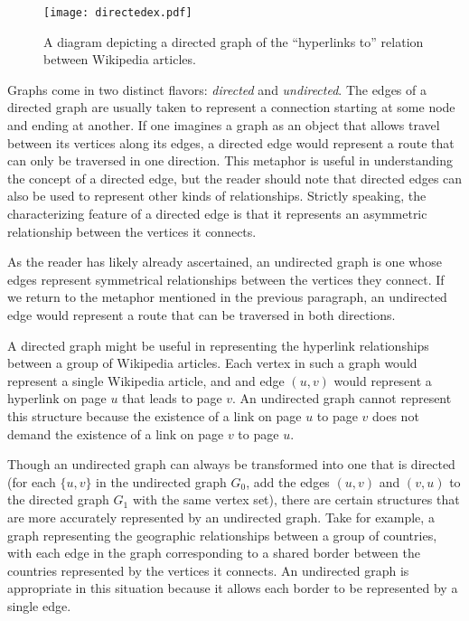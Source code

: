 \documentclass[12pt,twoside]{reedthesis}
\newcommand{\im}[1]{{\em#1}}
\begin{document}
\begin{figure}[h!]
\begin{center}
\texttt{[image: directedex.pdf]}
\end{center}
\caption{A diagram depicting a directed graph of the ``hyperlinks to'' relation between Wikipedia articles.}
\end{figure}
Graphs come in two distinct flavors: \im{directed} and \im{undirected}. The edges of a directed graph are usually taken to represent a connection starting at some node and ending at another. If one imagines a graph as an object that allows travel between its vertices along its edges, a directed edge would represent a route that can only be traversed in one direction. This metaphor is useful in understanding the concept of a directed edge, but the reader should note that directed edges can also be used to represent other kinds of relationships. Strictly speaking, the characterizing feature of a directed edge is that it represents an asymmetric relationship between the vertices it connects.

As the reader has likely already ascertained, an undirected graph is one whose edges represent symmetrical relationships between the vertices they connect. If we return to the metaphor mentioned in the previous paragraph, an undirected edge would represent a route that can be traversed in both directions.

A directed graph might be useful in representing the hyperlink relationships between a group of Wikipedia articles. Each vertex in such a graph would represent a single Wikipedia article, and and edge $(u,v)$ would represent a hyperlink on page $u$ that leads to page $v$. An undirected graph cannot represent this structure because the existence of a link on page $u$ to page $v$ does not demand the existence of a link on page $v$ to page $u$.

Though an undirected graph can always be transformed into one that is directed (for each $\{u,v\}$ in the undirected graph $G_0$, add the edges $(u,v)$ and $(v,u)$ to the directed graph $G_1$ with the same vertex set), there are certain structures that are more accurately represented by an undirected graph. Take for example, a graph representing the geographic relationships between a group of countries, with each edge in the graph corresponding to a shared border between the countries represented by the vertices it connects. An undirected graph is appropriate in this situation because it allows each border to be represented by a single edge.
\end{document}
